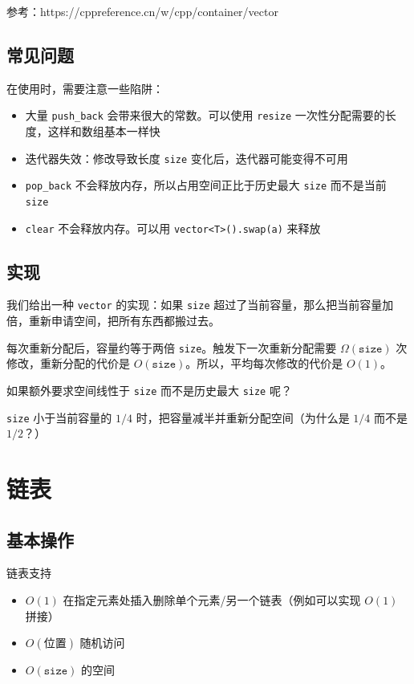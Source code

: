 参考：https://cppreference.cn/w/cpp/container/vector



\subsection{常见问题}
在使用时，需要注意一些陷阱：
\begin{itemize}
    \item 大量 \texttt{push\_back} 会带来很大的常数。可以使用 \texttt{resize} 一次性分配需要的长度，这样和数组基本一样快
    \item 迭代器失效：修改导致长度 \texttt{size} 变化后，迭代器可能变得不可用
    \item \texttt{pop\_back} 不会释放内存，所以占用空间正比于历史最大 \texttt{size} 而不是当前 \texttt{size}
    \item \texttt{clear} 不会释放内存。可以用 \texttt{vector<T>().swap(a)} 来释放 
\end{itemize}

\subsection{实现}
我们给出一种 \texttt{vector} 的实现：如果 \texttt{size} 超过了当前容量，那么把当前容量加倍，重新申请空间，把所有东西都搬过去。

每次重新分配后，容量约等于两倍 \texttt{size}。触发下一次重新分配需要 $\Omega(\mathtt{size})$ 次修改，重新分配的代价是 $O(\mathtt{size})$。所以，平均每次修改的代价是 $O(1)$。

    \begin{question}
        如果额外要求空间线性于 \texttt{size} 而不是历史最大 \texttt{size} 呢？
    \end{question}
    \begin{solution}
    \texttt{size} 小于当前容量的 $1/4$ 时，把容量减半并重新分配空间（为什么是 $1/4$ 而不是 $1/2$？）
    \end{solution}
   
\section{链表}   

\subsection{基本操作}
    链表支持

    \begin{itemize}
        \item $O(1)$ 在指定元素处插入删除单个元素/另一个链表（例如可以实现 $O(1)$ 拼接）
        \item $O(\text{位置})$ 随机访问
        \item $O(\mathtt{size})$ 的空间
    \end{itemize}

